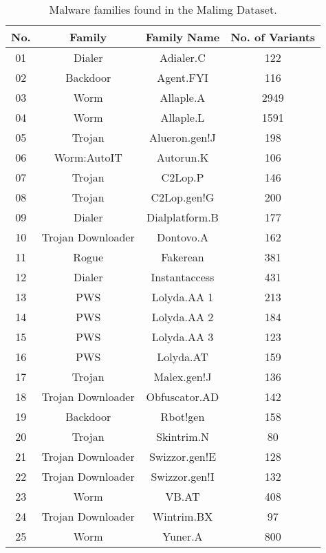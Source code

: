 \documentclass[sigconf]{acmart}
\begin{document}
\begin{table}[!htb]
\centering
\caption{Malware families found in the Malimg Dataset\cite{nataraj2011malware}.}
		\begin{tabular}{cccc}
		\toprule
		No. & Family & Family Name & No. of Variants \\
		\midrule
		01	&	Dialer				&	Adialer.C 		&	122 \\
		02	&	Backdoor			&	Agent.FYI 		&	116 \\
		03	&	Worm	 			&	Allaple.A 		&	2949 \\
		04	&	Worm 				&	Allaple.L 		&	1591 \\
		05	&	Trojan 				&	Alueron.gen!J 	&	198 \\
		06	&	Worm:AutoIT 		&	Autorun.K 		&	106 \\
		07	&	Trojan 				&	C2Lop.P 		&	146 \\
		08	&	Trojan 				&	C2Lop.gen!G 	&	200 \\
		09	&	Dialer 				&	Dialplatform.B 	&	177 \\
		10	&	Trojan Downloader	&	Dontovo.A 		&	162 \\
		11	&	Rogue 				&	Fakerean 		&	381 \\
		12	&	Dialer				&	Instantaccess 	&	431 \\
		13	&	PWS 				&	Lolyda.AA 1 	&	213 \\
		14	&	PWS 				&	Lolyda.AA 2 	&	184 \\
		15	&	PWS 				&	Lolyda.AA 3 	&	123 \\
		16	&	PWS					&	Lolyda.AT 		&	159 \\
		17	&	Trojan				&	Malex.gen!J 	&	136 \\
		18	&	Trojan Downloader	&	Obfuscator.AD 	&	142 \\
		19	&	Backdoor			&	Rbot!gen 		&	158 \\
		20	&	Trojan				&	Skintrim.N 		&	80 \\
		21	&	Trojan Downloader	&	Swizzor.gen!E 	&	128 \\
		22	&	Trojan Downloader	&	Swizzor.gen!I 	&	132 \\
		23	&	Worm				&	VB.AT 			&	408 \\
		24	&	Trojan Downloader	&	Wintrim.BX 		&	97 \\
		25	&	Worm				&	Yuner.A 		&	800 \\
		\bottomrule
		\end{tabular}\\
		\label{table: malimg-dataset}
\end{table}
\end{document}
